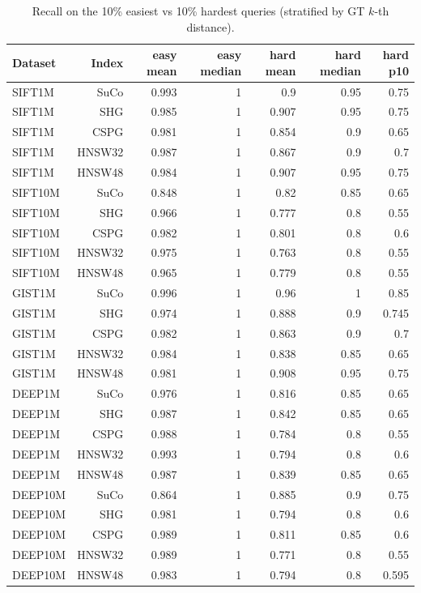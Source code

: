 \begin{table}[t]
\centering
\small
\caption{Recall on the 10\% easiest vs 10\% hardest queries (stratified by GT $k$-th distance).}
\label{tab:hard-easy}
\begin{tabular}{lrrrrrr}
\toprule
Dataset & Index & easy mean & easy median & hard mean & hard median & hard p10 \\
\midrule
SIFT1M & SuCo & 0.993 & 1 & 0.9 & 0.95 & 0.75 \\
SIFT1M & SHG & 0.985 & 1 & 0.907 & 0.95 & 0.75 \\
SIFT1M & CSPG & 0.981 & 1 & 0.854 & 0.9 & 0.65 \\
SIFT1M & HNSW32 & 0.987 & 1 & 0.867 & 0.9 & 0.7 \\
SIFT1M & HNSW48 & 0.984 & 1 & 0.907 & 0.95 & 0.75 \\
SIFT10M & SuCo & 0.848 & 1 & 0.82 & 0.85 & 0.65 \\
SIFT10M & SHG & 0.966 & 1 & 0.777 & 0.8 & 0.55 \\
SIFT10M & CSPG & 0.982 & 1 & 0.801 & 0.8 & 0.6 \\
SIFT10M & HNSW32 & 0.975 & 1 & 0.763 & 0.8 & 0.55 \\
SIFT10M & HNSW48 & 0.965 & 1 & 0.779 & 0.8 & 0.55 \\
GIST1M & SuCo & 0.996 & 1 & 0.96 & 1 & 0.85 \\
GIST1M & SHG & 0.974 & 1 & 0.888 & 0.9 & 0.745 \\
GIST1M & CSPG & 0.982 & 1 & 0.863 & 0.9 & 0.7 \\
GIST1M & HNSW32 & 0.984 & 1 & 0.838 & 0.85 & 0.65 \\
GIST1M & HNSW48 & 0.981 & 1 & 0.908 & 0.95 & 0.75 \\
DEEP1M & SuCo & 0.976 & 1 & 0.816 & 0.85 & 0.65 \\
DEEP1M & SHG & 0.987 & 1 & 0.842 & 0.85 & 0.65 \\
DEEP1M & CSPG & 0.988 & 1 & 0.784 & 0.8 & 0.55 \\
DEEP1M & HNSW32 & 0.993 & 1 & 0.794 & 0.8 & 0.6 \\
DEEP1M & HNSW48 & 0.987 & 1 & 0.839 & 0.85 & 0.65 \\
DEEP10M & SuCo & 0.864 & 1 & 0.885 & 0.9 & 0.75 \\
DEEP10M & SHG & 0.981 & 1 & 0.794 & 0.8 & 0.6 \\
DEEP10M & CSPG & 0.989 & 1 & 0.811 & 0.85 & 0.6 \\
DEEP10M & HNSW32 & 0.989 & 1 & 0.771 & 0.8 & 0.55 \\
DEEP10M & HNSW48 & 0.983 & 1 & 0.794 & 0.8 & 0.595 \\

\end{tabular}
\end{table}
